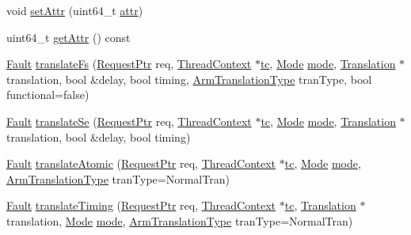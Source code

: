 \begin{DoxyCompactItemize}
\item 
void \hyperlink{classArmISA_1_1TLB_af863223c2fa90b0bbb305626dc3bc604}{setAttr} (uint64\_\-t \hyperlink{namespaceArmISA_a710acfac10f0042826d2d6d9c213ae7b}{attr})
\item 
uint64\_\-t \hyperlink{classArmISA_1_1TLB_abe784aff035154580e3b0fc0f5af8bd5}{getAttr} () const 
\item 
\hyperlink{classRefCountingPtr}{Fault} \hyperlink{classArmISA_1_1TLB_a3d876e306a41e194bda2747ea51982f8}{translateFs} (\hyperlink{classRequest}{RequestPtr} req, \hyperlink{classThreadContext}{ThreadContext} $\ast$\hyperlink{namespaceArmISA_a5aff829af55e65b802d83dfcef4e9dd0}{tc}, \hyperlink{classBaseTLB_a46c8a310cf4c094f8c80e1cb8dc1f911}{Mode} \hyperlink{namespaceArmISA_a5f3b9b97eb2dfa29d33e74878455f90d}{mode}, \hyperlink{classBaseTLB_1_1Translation}{Translation} $\ast$translation, bool \&delay, bool timing, \hyperlink{classArmISA_1_1TLB_ad6f5d480df151d5bddeefc6271793f08}{ArmTranslationType} tranType, bool functional=false)
\item 
\hyperlink{classRefCountingPtr}{Fault} \hyperlink{classArmISA_1_1TLB_a6ada13dabe05b90fee0464345cf0f654}{translateSe} (\hyperlink{classRequest}{RequestPtr} req, \hyperlink{classThreadContext}{ThreadContext} $\ast$\hyperlink{namespaceArmISA_a5aff829af55e65b802d83dfcef4e9dd0}{tc}, \hyperlink{classBaseTLB_a46c8a310cf4c094f8c80e1cb8dc1f911}{Mode} \hyperlink{namespaceArmISA_a5f3b9b97eb2dfa29d33e74878455f90d}{mode}, \hyperlink{classBaseTLB_1_1Translation}{Translation} $\ast$translation, bool \&delay, bool timing)
\item 
\hyperlink{classRefCountingPtr}{Fault} \hyperlink{classArmISA_1_1TLB_ad9813aa5a0ed9ba84b634d9960006ed2}{translateAtomic} (\hyperlink{classRequest}{RequestPtr} req, \hyperlink{classThreadContext}{ThreadContext} $\ast$\hyperlink{namespaceArmISA_a5aff829af55e65b802d83dfcef4e9dd0}{tc}, \hyperlink{classBaseTLB_a46c8a310cf4c094f8c80e1cb8dc1f911}{Mode} \hyperlink{namespaceArmISA_a5f3b9b97eb2dfa29d33e74878455f90d}{mode}, \hyperlink{classArmISA_1_1TLB_ad6f5d480df151d5bddeefc6271793f08}{ArmTranslationType} tranType=NormalTran)
\item 
\hyperlink{classRefCountingPtr}{Fault} \hyperlink{classArmISA_1_1TLB_aece4eb62debdc9703b211d68ce771521}{translateTiming} (\hyperlink{classRequest}{RequestPtr} req, \hyperlink{classThreadContext}{ThreadContext} $\ast$\hyperlink{namespaceArmISA_a5aff829af55e65b802d83dfcef4e9dd0}{tc}, \hyperlink{classBaseTLB_1_1Translation}{Translation} $\ast$translation, \hyperlink{classBaseTLB_a46c8a310cf4c094f8c80e1cb8dc1f911}{Mode} \hyperlink{namespaceArmISA_a5f3b9b97eb2dfa29d33e74878455f90d}{mode}, \hyperlink{classArmISA_1_1TLB_ad6f5d480df151d5bddeefc6271793f08}{ArmTranslationType} tranType=NormalTran)

\end{DoxyCompactItemize}
